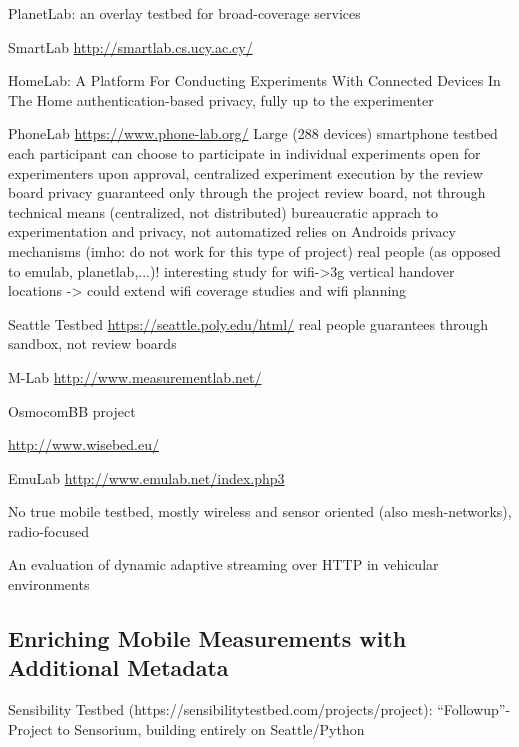PlanetLab: an overlay testbed for broad-coverage services \cite{chun2003planetlab}



SmartLab \url{http://smartlab.cs.ucy.ac.cy/}

HomeLab: A Platform For Conducting Experiments With Connected Devices In The Home \cite{Singh:2013:HPC:2486001.2491701}
authentication-based privacy, fully up to the experimenter

PhoneLab \url{https://www.phone-lab.org/} \cite{Nandugudi:2013:PLP:2536714.2536718}
Large (288 devices) smartphone testbed
each participant can choose to participate in individual experiments
open for experimenters upon approval, centralized experiment execution by the review board
privacy guaranteed only through the project review board, not through technical means (centralized, not distributed)
bureaucratic apprach to experimentation and privacy, not automatized
relies on Androids privacy mechanisms (imho: do not work for this type of project)
real people (as opposed to emulab, planetlab,...)!
interesting study for wifi->3g vertical handover locations -> could extend wifi coverage studies and wifi planning


Seattle Testbed \url{https://seattle.poly.edu/html/} \cite{Cappos:2009:SPE:1508865.1508905}
real people
guarantees through sandbox, not review boards

M-Lab \url{http://www.measurementlab.net/}

OsmocomBB project \cite{osmocombbwww}

\url{http://www.wisebed.eu/}

EmuLab \url{http://www.emulab.net/index.php3}


No true mobile testbed, mostly wireless and sensor oriented (also mesh-networks), radio-focused

An evaluation of dynamic adaptive streaming over \gls{HTTP} in vehicular environments \cite{Muller:2012:EDA:2151677.2151686}


\subsection{Enriching Mobile Measurements with Additional Metadata}
\label{c6:sensorium}



Sensibility Testbed (https://sensibilitytestbed.com/projects/project): ``Followup''-Project to Sensorium, building entirely on Seattle/Python


